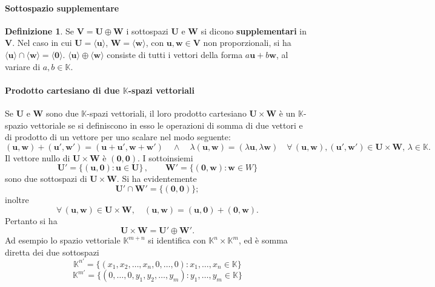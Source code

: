 \documentclass{article}
\theoremstyle{plain}
\theoremstyle{definition}
\newtheorem{defn}{Definizione}[section]
\theoremstyle{remark}
\begin{document}
\vspace{10pt}

\paragraph{Sottospazio supplementare}
\begin{bxthm}
\begin{defn}
    Se \( \mathbf{V} = \mathbf{U} \oplus \mathbf{W} \) i sottospazi \( \mathbf{U} \) e \( \mathbf{W} \) si dicono \textbf{supplementari} in \( \mathbf{V} \).
    Nel caso in cui \( \mathbf{U} = \langle \mathbf{u}\rangle \), \( \mathbf{W} = \langle \mathbf{w}\rangle \), con \( \mathbf{u}, \mathbf{w} \in \mathbf{V} \) non proporzionali, si ha
    \( \langle \mathbf{u}\rangle \cap \langle \mathbf{w}\rangle = \langle \mathbf{0}\rangle \). 
    \( \langle \mathbf{u}\rangle \oplus \langle \mathbf{w}\rangle \) consiste di tutti i vettori della forma \( a\mathbf{u} + b\mathbf{w} \), al
    variare di \( a, b \in \mathbb{K} \).
\end{defn}
\end{bxthm}

\vspace{10pt}

\paragraph{Prodotto cartesiano di due $\mathbb{K}$-spazi vettoriali}
Se \( \mathbf{U} \) e \( \mathbf{W} \) sono due \( \mathbb{K} \)-spazi vettoriali, il loro prodotto cartesiano \( \mathbf{U} \times \mathbf{W} \) è un
\( \mathbb{K} \)-spazio vettoriale se si definiscono in esso le operazioni di somma di due vettori e di prodotto di un vettore per uno scalare nel modo seguente:
\[ 
    (\mathbf{u}, \mathbf{w}) + (\mathbf{u}', \mathbf{w}') = (\mathbf{u} + \mathbf{u}', \mathbf{w} + \mathbf{w}') \quad\land\quad \lambda(\mathbf{u}, \mathbf{w}) = (\lambda\mathbf{u}, \lambda\mathbf{w}) \quad \forall\,(\mathbf{u}, \mathbf{w}), (\mathbf{u}', \mathbf{w}') \in \mathbf{U} \times \mathbf{W},\, \lambda \in \mathbb{K}.
\]
Il vettore nullo di \( \mathbf{U} \times \mathbf{W} \) è \( (\mathbf{0}, \mathbf{0}) \).
I sottoinsiemi
\[ 
    \mathbf{U}' = \{(\mathbf{u}, \mathbf{0}): \mathbf{u} \in \mathbf{U}\}\,, \quad\quad \mathbf{W}' = \{(\mathbf{0}, \mathbf{w}): \mathbf{w} \in W\} 
\]
sono due sottospazi di \( \mathbf{U} \times \mathbf{W} \). 
Si ha evidentemente
\[ 
    \mathbf{U}' \cap \mathbf{W}' = \{(\mathbf{0}, \mathbf{0})\}; 
\]
inoltre
\[ 
    \forall\, (\mathbf{u}, \mathbf{w}) \in \mathbf{U} \times \mathbf{W},\quad (\mathbf{u}, \mathbf{w}) = (\mathbf{u}, \mathbf{0}) + (\mathbf{0}, \mathbf{w}).
\]
Pertanto si ha
\[ 
    \mathbf{U} \times \mathbf{W} = \mathbf{U}' \oplus \mathbf{W}' .
\]
Ad esempio lo spazio vettoriale \( \mathbb{K}^{m+n} \) si identifica con \( \mathbb{K}^n \times \mathbb{K}^m \), ed è somma diretta dei due sottospazi
\[ 
    \mathbb{K}^{n\prime} = \{(x_1, x_2, \ldots, x_n, 0, \ldots, 0): x_1, \ldots, x_n \in \mathbb{K}\} 
\]
\[ 
    \mathbb{K}^{m\prime} = \{(0, \ldots, 0, y_1, y_2, \ldots, y_m): y_1, \ldots, y_m \in \mathbb{K}\} 
\]
\end{document}
